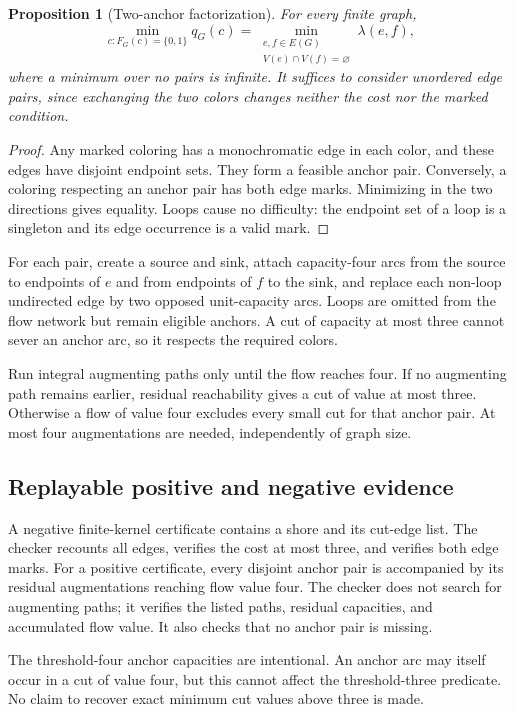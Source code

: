 \documentclass[11pt]{article}
\newtheorem{proposition}[theorem]{Proposition}
\theoremstyle{remark}\newtheorem{remark}[theorem]{Remark}
\begin{document}
\begin{proposition}[Two-anchor factorization]
\label{prop:anchors}
For every finite graph,
\[
 \min_{c:F_G(c)=\{0,1\}}q_G(c)
   =\min_{\substack{e,f\in E(G)\\V(e)\cap V(f)=\varnothing}}\lambda(e,f),
\]
where a minimum over no pairs is infinite. It suffices to consider unordered edge pairs, since exchanging the two colors changes neither the cost nor the marked condition.
\end{proposition}
\begin{proof}
Any marked coloring has a monochromatic edge in each color, and these edges have disjoint endpoint sets. They form a feasible anchor pair. Conversely, a coloring respecting an anchor pair has both edge marks. Minimizing in the two directions gives equality. Loops cause no difficulty: the endpoint set of a loop is a singleton and its edge occurrence is a valid mark.
\end{proof}

For each pair, create a source and sink, attach capacity-four arcs from the source to endpoints of $e$ and from endpoints of $f$ to the sink, and replace each non-loop undirected edge by two opposed unit-capacity arcs. Loops are omitted from the flow network but remain eligible anchors. A cut of capacity at most three cannot sever an anchor arc, so it respects the required colors.

Run integral augmenting paths only until the flow reaches four. If no augmenting path remains earlier, residual reachability gives a cut of value at most three. Otherwise a flow of value four excludes every small cut for that anchor pair. At most four augmentations are needed, independently of graph size.

\subsection{Replayable positive and negative evidence}
A negative finite-kernel certificate contains a shore and its cut-edge list. The checker recounts all edges, verifies the cost at most three, and verifies both edge marks. For a positive certificate, every disjoint anchor pair is accompanied by its residual augmentations reaching flow value four. The checker does not search for augmenting paths; it verifies the listed paths, residual capacities, and accumulated flow value. It also checks that no anchor pair is missing.

The threshold-four anchor capacities are intentional. An anchor arc may itself occur in a cut of value four, but this cannot affect the threshold-three predicate. No claim to recover exact minimum cut values above three is made.
\end{document}
